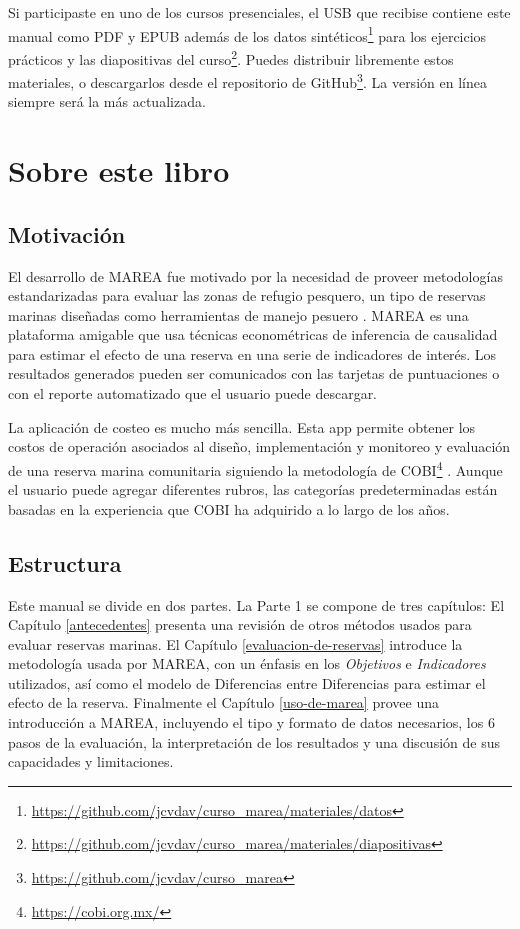 \documentclass[]{krantz}
\renewcommand{\href}[2]{#2\footnote{\url{#1}}}
\begin{document}
Si participaste en uno de los cursos presenciales, el USB que recibise
contiene este manual como PDF y EPUB además de los
\href{https://github.com/jcvdav/curso_marea/materiales/datos}{datos
sintéticos} para los ejercicios prácticos y las
\href{https://github.com/jcvdav/curso_marea/materiales/diapositivas}{diapositivas
del curso}. Puedes distribuir libremente estos materiales, o
descargarlos desde el
\href{https://github.com/jcvdav/curso_marea}{repositorio de GitHub}. La
versión en línea siempre será la más actualizada.

\hypertarget{sobre-este-libro}{%
\section{Sobre este libro}\label{sobre-este-libro}}

\hypertarget{motivacion}{%
\subsection{Motivación}\label{motivacion}}

El desarrollo de MAREA fue motivado por la necesidad de proveer
metodologías estandarizadas para evaluar las zonas de refugio pesquero,
un tipo de reservas marinas diseñadas como herramientas de manejo
pesuero \citep{nom}. MAREA es una plataforma amigable que usa técnicas
econométricas de inferencia de causalidad para estimar el efecto de una
reserva en una serie de indicadores de interés. Los resultados generados
pueden ser comunicados con las tarjetas de puntuaciones o con el reporte
automatizado que el usuario puede descargar.

La aplicación de costeo es mucho más sencilla. Esta app permite obtener
los costos de operación asociados al diseño, implementación y monitoreo
y evaluación de una reserva marina comunitaria siguiendo la metodología
de \href{https://cobi.org.mx/}{COBI} \citep{uribe_2010}. Aunque el
usuario puede agregar diferentes rubros, las categorías predeterminadas
están basadas en la experiencia que COBI ha adquirido a lo largo de los
años.

\hypertarget{estructura}{%
\subsection{Estructura}\label{estructura}}

Este manual se divide en dos partes. La Parte 1 se compone de tres
capítulos: El Capítulo \ref{antecedentes} presenta una revisión de otros
métodos usados para evaluar reservas marinas. El Capítulo
\ref{evaluacion-de-reservas} introduce la metodología usada por MAREA,
con un énfasis en los \emph{Objetivos} e \emph{Indicadores} utilizados,
así como el modelo de Diferencias entre Diferencias para estimar el
efecto de la reserva. Finalmente el Capítulo \ref{uso-de-marea} provee
una introducción a MAREA, incluyendo el tipo y formato de datos
necesarios, los 6 pasos de la evaluación, la interpretación de los
resultados y una discusión de sus capacidades y limitaciones.
\end{document}
